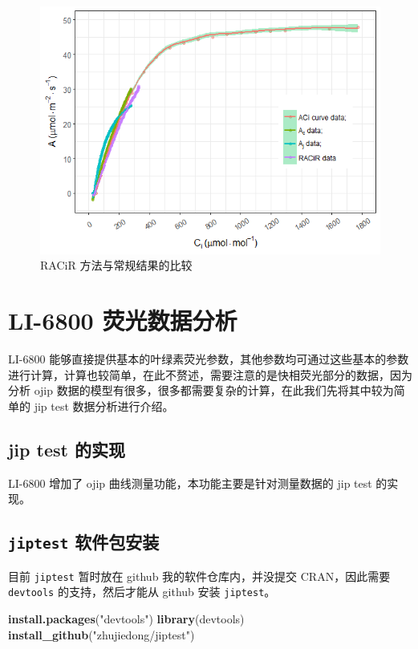 \documentclass[]{krantz}
\makeatletter
\newenvironment{Shaded}{\begin{snugshade}}{\end{snugshade}}
\newcommand{\KeywordTok}[1]{\textcolor[rgb]{0.13,0.29,0.53}{\textbf{#1}}}
\newcommand{\StringTok}[1]{\textcolor[rgb]{0.31,0.60,0.02}{#1}}
\newcommand{\NormalTok}[1]{#1}
\newenvironment{kframe}{%
\medskip{}
\setlength{\fboxsep}{.8em}
 \def\at@end@of@kframe{}%
 \ifinner\ifhmode%
  \def\at@end@of@kframe{\end{minipage}}%
  \begin{minipage}{\columnwidth}%
 \fi\fi%
 \def\FrameCommand##1{\hskip\@totalleftmargin \hskip-\fboxsep
 \colorbox{shadecolor}{##1}\hskip-\fboxsep
     \hskip-\linewidth \hskip-\@totalleftmargin \hskip\columnwidth}%
 \MakeFramed {\advance\hsize-\width
   \@totalleftmargin\z@ \linewidth\hsize
   \@setminipage}}%
 {\par\unskip\endMakeFramed%
 \at@end@of@kframe}
\renewenvironment{Shaded}{\begin{kframe}}{\end{kframe}}
\theoremstyle{definition}
\theoremstyle{definition}
\theoremstyle{definition}
\theoremstyle{remark}
\makeatother
\begin{document}
\begin{figure}
\includegraphics[width=1\linewidth]{images/racir} \caption{RACiR 方法与常规结果的比较}\label{fig:racir}
\end{figure}

\section{LI-6800 荧光数据分析}\label{fluro68}

LI-6800
能够直接提供基本的叶绿素荧光参数，其他参数均可通过这些基本的参数进行计算，计算也较简单，在此不赘述，需要注意的是快相荧光部分的数据，因为分析
ojip 数据的模型有很多，很多都需要复杂的计算，在此我们先将其中较为简单的
jip test 数据分析进行介绍。

\subsection{jip test 的实现}\label{jiptest}

LI-6800 增加了 ojip 曲线测量功能，本功能主要是针对测量数据的 jip test
的实现。

\subsection{\texorpdfstring{\texttt{jiptest}
软件包安装}{jiptest 软件包安装}}\label{jiptest_pack}

目前 \texttt{jiptest} 暂时放在 github 我的软件仓库内，并没提交
CRAN，因此需要 \texttt{devtools} 的支持，然后才能从 github 安装
\texttt{jiptest}。

\begin{Shaded}
\begin{Highlighting}[]
\KeywordTok{install.packages}\NormalTok{(}\StringTok{"devtools"}\NormalTok{)}
\KeywordTok{library}\NormalTok{(devtools)}
\KeywordTok{install_github}\NormalTok{(}\StringTok{"zhujiedong/jiptest"}\NormalTok{)}
\end{Highlighting}
\end{Shaded}
\end{document}
